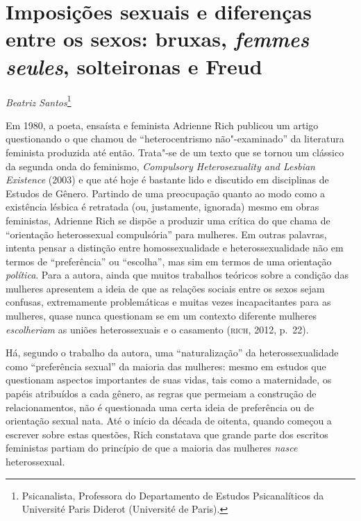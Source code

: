 \chapter*{Imposições sexuais e diferenças entre os sexos: bruxas,
\emph{femmes seules}, solteironas e Freud}


\begin{flushright}
\emph{Beatriz Santos}\footnote{Psicanalista, Professora do Departamento de Estudos Psicanalíticos da Université Paris Diderot (Université de Paris).}
\end{flushright}


Em 1980, a poeta, ensaísta e feminista Adrienne Rich publicou um artigo
questionando o que chamou de ``heterocentrismo não"-examinado'' da
literatura feminista produzida até então. Trata"-se de um texto que se
tornou um clássico da segunda onda do feminismo, \emph{Compulsory
Heterosexuality and Lesbian Existence} (2003) e que até hoje é bastante lido e discutido
em disciplinas de Estudos de Gênero. Partindo de uma preocupação quanto
ao modo como a existência lésbica é retratada (ou, justamente, ignorada)
mesmo em obras feministas, Adrienne Rich se dispõe a produzir uma
crítica do que chama de ``orientação heterossexual compulsória'' para
mulheres. Em outras palavras, intenta pensar a distinção entre
homossexualidade e heterossexualidade não em termos de ``preferência''
ou ``escolha'', mas sim em termos de uma orientação \emph{política}.
Para a autora, ainda que muitos trabalhos teóricos sobre a condição das
mulheres apresentem a ideia de que as relações sociais entre os sexos
sejam confusas, extremamente problemáticas e muitas vezes incapacitantes
para as mulheres, quase nunca questionam se em um contexto diferente
mulheres \emph{escolheriam} as uniões heterossexuais e o
casamento (\textsc{rich}, 2012, p.~22).

Há, segundo o trabalho da autora, uma ``naturalização'' da
heterossexualidade como ``preferência sexual'' da maioria das mulheres:
mesmo em estudos que questionam aspectos importantes de suas vidas, tais
como a maternidade, os papéis atribuídos a cada gênero, as regras que
permeiam a construção de relacionamentos, não é questionada uma certa
ideia de preferência ou de orientação sexual nata. Até o início da
década de oitenta, quando começou a escrever sobre estas questões, Rich
constatava que grande parte dos escritos feministas partiam do princípio
de que a maioria das mulheres \emph{nasce} heterossexual.


